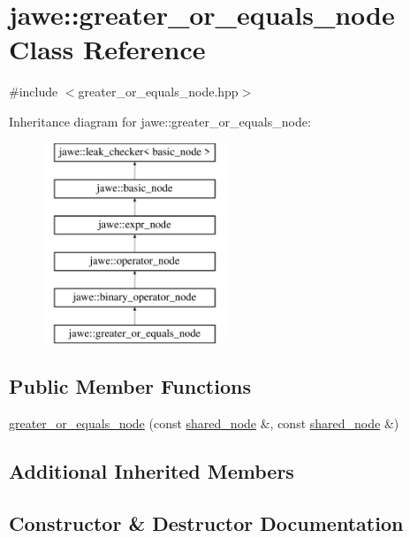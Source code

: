 \hypertarget{classjawe_1_1greater__or__equals__node}{}\section{jawe\+:\+:greater\+\_\+or\+\_\+equals\+\_\+node Class Reference}
\label{classjawe_1_1greater__or__equals__node}


{\ttfamily \#include $<$greater\+\_\+or\+\_\+equals\+\_\+node.\+hpp$>$}

Inheritance diagram for jawe\+:\+:greater\+\_\+or\+\_\+equals\+\_\+node\+:\begin{figure}[H]
\begin{center}
\leavevmode
\includegraphics[height=6.000000cm]{classjawe_1_1greater__or__equals__node}
\end{center}
\end{figure}
\subsection*{Public Member Functions}
\begin{DoxyCompactItemize}
\item 
\hyperlink{classjawe_1_1greater__or__equals__node_a6276e23fcf9b755967feba464f9f4e12}{greater\+\_\+or\+\_\+equals\+\_\+node} (const \hyperlink{namespacejawe_a3f307481d921b6cbb50cc8511fc2b544}{shared\+\_\+node} \&, const \hyperlink{namespacejawe_a3f307481d921b6cbb50cc8511fc2b544}{shared\+\_\+node} \&)
\end{DoxyCompactItemize}
\subsection*{Additional Inherited Members}


\subsection{Constructor \& Destructor Documentation}
\mbox{\label{classjawe_1_1greater__or__equals__node_a6276e23fcf9b755967feba464f9f4e12}} 
